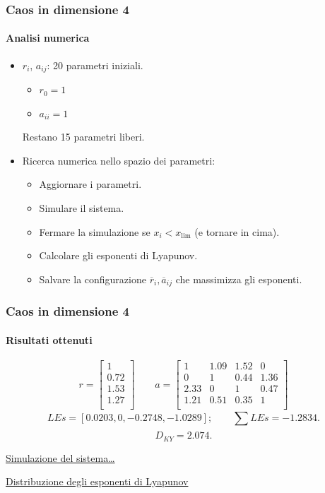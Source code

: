 \begin{frame}
\frametitle{Caos in dimensione 4}
\framesubtitle{Analisi numerica}
\begin{itemize}
    \item $r_i$, $a_{ij}$: 20 parametri iniziali.
	\begin{itemize}
	    \item $r_0=1$ 
	    \item $a_{ii} = 1$ 
	\end{itemize}
	Restano 15 parametri liberi.
    \item Ricerca numerica nello spazio dei parametri:
	\begin{itemize}
	    \item Aggiornare i parametri.
	    \item Simulare il sistema.
	    \item Fermare la simulazione se $x_i < x_{\text{lim}}$ (e tornare in cima).
	    \item Calcolare gli esponenti di Lyapunov.
	    \item Salvare la configurazione $\overline{r}_i, \overline{a}_{ij}$ che massimizza gli esponenti.
	\end{itemize}
\end{itemize}
\end{frame}

\begin{frame}
\frametitle{Caos in dimensione 4}
\framesubtitle{Risultati ottenuti}
\[
    r =\begin{bmatrix}
        1 \\
        0.72 \\
        1.53 \\
        1.27 \\
    \end{bmatrix} \qquad 
    a =\begin{bmatrix}
        1 & 1.09 & 1.52 & 0 \\
        0 & 1 & 0.44 & 1.36 \\
        2.33 & 0 & 1 & 0.47 \\
        1.21 & 0.51 & 0.35 & 1 \\
    \end{bmatrix}
\] 
\vspace{1em}
\[
    LEs = \left[0.0203, 0, -0.2748, -1.0289\right]; \qquad  \sum_{}^{} LEs = -1.2834
.\] 
\vspace{0.5em}
\[
    D_{KY} = 2.074
.\] 
\vspace{0.5em}
\begin{center}
\textcolor{blue}{\href{run:link/LV_simu.html}{Simulazione del sistema\ldots}}
\end{center}
\begin{center}
\textcolor{blue}{\href{run:link/Max_LE.html}{Distribuzione degli esponenti di Lyapunov}}
\end{center}
\end{frame}

